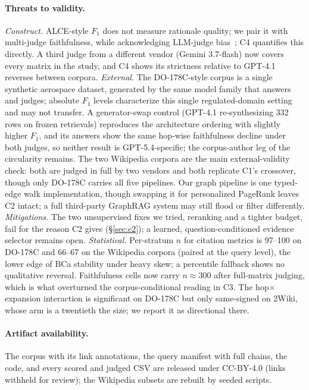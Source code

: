 \paragraph{Threats to validity.}
\textit{Construct.} ALCE-style $F_1$ does not measure rationale quality;
we pair it with multi-judge faithfulness, while acknowledging LLM-judge
bias~\cite{selfpref_bias2024,wallat2024}; C4 quantifies this directly.
A third judge from a different vendor (Gemini 3.7-flash) now covers
every matrix in the study, and C4 shows its strictness relative to
GPT-4.1 reverses between corpora.
\textit{External.} The DO-178C-style corpus is a single synthetic
aerospace dataset, generated by the same model family that answers and
judges; absolute $F_1$ levels characterize this single
regulated-domain setting and may not transfer. A generator-swap
control (GPT-4.1 re-synthesizing 332 rows on frozen retrievals)
reproduces the architecture ordering with slightly higher $F_1$, and
its answers show the same hop-wise faithfulness decline under both
judges, so neither result is GPT-5.4-specific; the corpus-author leg
of the circularity remains. The two Wikipedia corpora are the main
external-validity check: both are judged in full by two vendors and
both replicate C1's crossover, though only DO-178C carries all five
pipelines. Our graph pipeline
is one typed-edge walk implementation, though swapping it for
personalized PageRank leaves C2 intact; a full third-party GraphRAG
system may still flood or filter differently.
\textit{Mitigations.} The two unsupervised fixes we tried, reranking
and a tighter budget, fail for the reason C2 gives (\S\ref{sec:c2}); a
learned, question-conditioned evidence selector remains open.
\textit{Statistical.} Per-stratum $n$ for citation metrics is 97--100
on DO-178C and 66--67 on the Wikipedia corpora (paired at the query
level), the lower edge of BCa stability under heavy skew; a
percentile fallback shows no qualitative reversal. Faithfulness cells
now carry $n\approx300$ after full-matrix judging, which is what
overturned the corpus-conditional reading in C3. The hop$\times$expansion
interaction is significant on DO-178C but only same-signed on 2Wiki,
whose arm is a twentieth the size; we report it as directional there.

\paragraph{Artifact availability.}
The corpus with its link annotations, the query manifest with full
chains, the code, and every scored and judged CSV are released under
CC-BY-4.0 (links withheld for review); the Wikipedia subsets are rebuilt
by seeded scripts.
